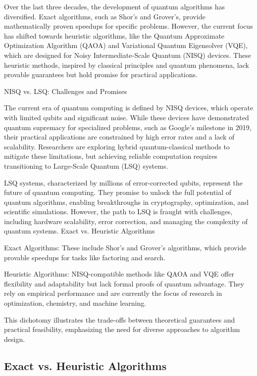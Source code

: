 Over the last three decades, the development of quantum algorithms has diversified. Exact algorithms, such as Shor’s and Grover’s, provide mathematically proven speedups for specific problems. However, the current focus has shifted towards heuristic algorithms, like the Quantum Approximate Optimization Algorithm (QAOA) and Variational Quantum Eigensolver (VQE), which are designed for Noisy Intermediate-Scale Quantum (NISQ) devices. These heuristic methods, inspired by classical principles and quantum phenomena, lack provable guarantees but hold promise for practical applications.

NISQ vs. LSQ: Challenges and Promises

The current era of quantum computing is defined by NISQ devices, which operate with limited qubits and significant noise. While these devices have demonstrated quantum supremacy for specialized problems, such as Google’s milestone in 2019, their practical applications are constrained by high error rates and a lack of scalability. Researchers are exploring hybrid quantum-classical methods to mitigate these limitations, but achieving reliable computation requires transitioning to Large-Scale Quantum (LSQ) systems.

LSQ systems, characterized by millions of error-corrected qubits, represent the future of quantum computing. They promise to unlock the full potential of quantum algorithms, enabling breakthroughs in cryptography, optimization, and scientific simulations. However, the path to LSQ is fraught with challenges, including hardware scalability, error correction, and managing the complexity of quantum systems.
Exact vs. Heuristic Algorithms

Exact Algorithms: These include Shor’s and Grover’s algorithms, which provide provable speedups for tasks like factoring and search.

Heuristic Algorithms: NISQ-compatible methods like QAOA and VQE offer flexibility and adaptability but lack formal proofs of quantum advantage. They rely on empirical performance and are currently the focus of research in optimization, chemistry, and machine learning.

This dichotomy illustrates the trade-offs between theoretical guarantees and practical feasibility, emphasizing the need for diverse approaches to algorithm design.


\subsection{Exact vs. Heuristic Algorithms}

